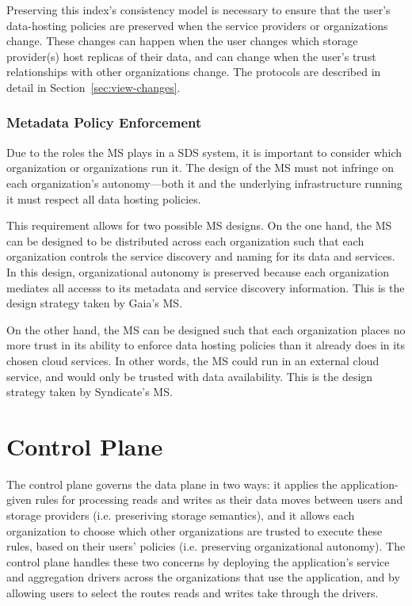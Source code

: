 Preserving this index's consistency model is necessary to ensure that the user's
data-hosting policies are preserved when the service providers or organizations
change.  These changes can happen when the user changes which storage
provider(s) host replicas of their data, and can change when the user's trust
relationships with other organizations change.  The protocols are described in
detail in Section~\ref{sec:view-changes}.


\subsubsection{Metadata Policy Enforcement}

Due to the roles the MS plays in a SDS system, it is important to consider
which organization or organizations run it.  The design of the MS must not infringe on
each organization's autonomy---both it and the underlying infrastructure
running it must respect all data hosting policies.

This requirement allows for two possible MS designs.  On the one hand,
the MS can be designed to be distributed across each organization such that each
organization controls the service discovery and naming for its data and
services.  In this design, organizational autonomy is preserved because each
organization mediates all accesss to its metadata and service discovery
information.  This is the design strategy taken by
Gaia's MS.

On the other hand, the MS can be designed such that each organization
places no more trust in its ability to enforce data hosting policies
than it already does in its chosen cloud services.  In other words, the
MS could run in an external cloud service, and would only be trusted
with data availability.  This is the design strategy taken by Syndicate's MS.

\section{Control Plane}

The control plane governs the data plane in two ways:  it applies
the application-given rules for processing reads and writes as their data moves
between users and storage providers (i.e. preseriving storage semantics),
and it allows each organization to choose which other organizations
are trusted to execute these rules, based on their users' policies
(i.e. preserving organizational autonomy).
The control plane handles these two concerns by deploying the application's
service and aggregation drivers across the organizations that use the
application, and by allowing users
to select the routes reads and writes take through the drivers.

